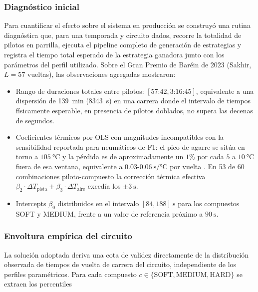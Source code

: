 \subsubsection{Diagnóstico inicial}
\label{sssec:diagnostico_spread}

Para cuantificar el efecto sobre el sistema en producción se construyó una rutina diagnóstica que, para una temporada y circuito dados, recorre la totalidad de pilotos en parrilla, ejecuta el pipeline completo de generación de estrategias y registra el tiempo total esperado de la estrategia ganadora junto con los parámetros del perfil utilizado. Sobre el Gran Premio de Baréin de 2023 (Sakhir, $L = 57$ vueltas), las observaciones agregadas mostraron:

\begin{itemize}
    \item Rango de duraciones totales entre pilotos: $[57\text{:}42, 3\text{:}16\text{:}45]$, equivalente a una dispersión de \SI{139}{\minute} (\SI{8343}{\second}) en una carrera donde el intervalo de tiempos físicamente esperable, en presencia de pilotos doblados, no supera las decenas de segundos.
    \item Coeficientes térmicos por OLS con magnitudes incompatibles con la sensibilidad reportada para neumáticos de F1: el pico de agarre se sitúa en torno a $105~\si{\celsius}$ y la pérdida es de aproximadamente un $1\%$ por cada $5$ a $10~\si{\celsius}$ fuera de esa ventana, equivalente a $0.03$-$0.06~\si{\second\per\celsius}$ por vuelta \cite{symonds2024tyretemp}. En 53 de 60 combinaciones piloto-compuesto la corrección térmica efectiva $\beta_2 \cdot \Delta T_{\text{pista}} + \beta_3 \cdot \Delta T_{\text{aire}}$ excedía los $\pm 3~\si{\second}$.
    \item Intercepts $\beta_0$ distribuidos en el intervalo $[84, 188]~\si{\second}$ para los compuestos SOFT y MEDIUM, frente a un valor de referencia próximo a $90~\si{\second}$.
\end{itemize}

\subsubsection{Envoltura empírica del circuito}
\label{sssec:envoltura_definicion}

La solución adoptada deriva una cota de validez directamente de la distribución observada de tiempos de vuelta de carrera del circuito, independiente de los perfiles paramétricos. Para cada compuesto $c \in \{\text{SOFT}, \text{MEDIUM}, \text{HARD}\}$ se extraen los percentiles

